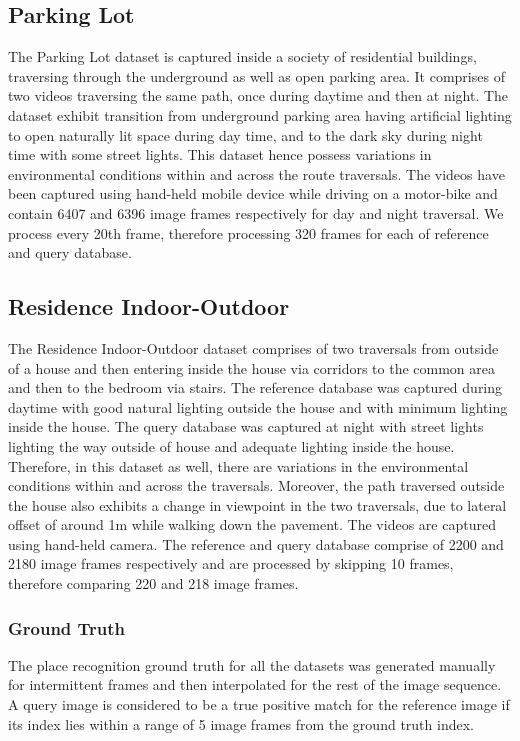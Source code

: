 \documentclass[letterpaper, 10 pt, conference]{ieeeconf}  %
\begin{document}
\subsection{Parking Lot}
The Parking Lot dataset is captured inside a society of residential buildings, traversing through the underground as well as open parking area. It comprises of two videos traversing the same path, once during daytime and then at night. The dataset exhibit transition from underground parking area having artificial lighting to open naturally lit space during day time, and to the dark sky during night time with some street lights. This dataset hence possess variations in environmental conditions within and across the route traversals. The videos have been captured using hand-held mobile device while driving on a motor-bike and contain 6407 and 6396 image frames respectively for day and night traversal. We process every 20th frame, therefore processing 320 frames for each of reference and query database.

\subsection{Residence Indoor-Outdoor}
The Residence Indoor-Outdoor dataset comprises of two traversals from outside of a house and then entering inside the house via corridors to the common area and then to the bedroom via stairs. The reference database was captured during daytime with good natural lighting outside the house and with minimum lighting inside the house. The query database was captured at night with street lights lighting the way outside of house and adequate lighting inside the house. Therefore, in this dataset as well, there are variations in the environmental conditions within and across the traversals. Moreover, the path traversed outside the house also exhibits a change in viewpoint in the two traversals, due to lateral offset of around 1m while walking down the pavement. The videos are captured using hand-held camera. The reference and query database comprise of 2200 and 2180 image frames respectively and are processed by skipping 10 frames, therefore comparing 220 and 218 image frames.

\subsubsection{Ground Truth}
The place recognition ground truth for all the datasets was generated manually for intermittent frames and then interpolated for the rest of the image sequence. A query image is considered to be a true positive match for the reference image if its index lies within a range of 5 image frames from the ground truth index.
\end{document}
